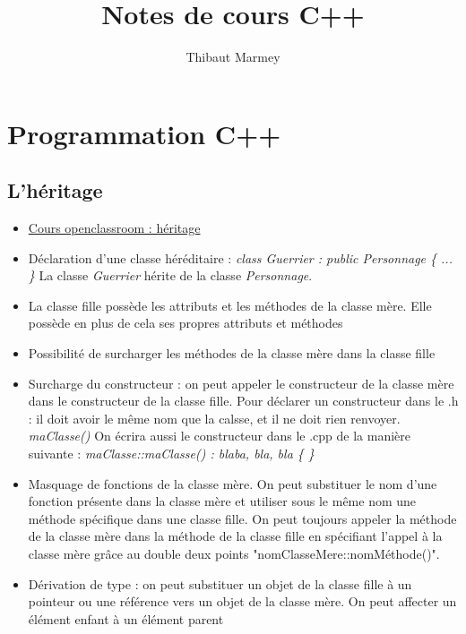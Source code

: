 \documentclass[12pt,a4paper]{article}
\author{Thibaut Marmey}
\title{Notes de cours C++}
\begin{document}
	\maketitle

\begin{normalsize}
\tableofcontents
\end{normalsize}

\section{Programmation C++}
\subsection{L'héritage}
\begin{itemize}
\item \href{https://openclassrooms.com/fr/courses/1894236-programmez-avec-le-langage-c/1898475-lheritage}{Cours openclassroom : héritage}
\item Déclaration d'une classe héréditaire : \textit{class Guerrier : public Personnage \{ ... \}}
\newline La classe \textit{Guerrier} hérite de la classe \textit{Personnage}.
\item La classe fille possède les attributs et les méthodes de la classe mère. Elle possède en plus de cela ses propres attributs et méthodes
\item Possibilité de surcharger les méthodes de la classe mère dans la classe fille
\item Surcharge du constructeur : on peut appeler le constructeur de la classe mère dans le constructeur de la classe fille.
\newline Pour déclarer un constructeur dans le .h : il doit avoir le même nom que la calsse, et il ne doit rien renvoyer. \textit{maClasse()}
\newline On écrira aussi le constructeur dans le .cpp de la manière suivante : 
\newline \textit{maClasse::maClasse() : blaba, bla, bla \{ \}}
\item Masquage de fonctions de la classe mère. On peut substituer le nom d'une fonction présente dans la classe mère et utiliser sous le même nom une méthode spécifique dans une classe fille. On peut toujours appeler la méthode de la classe mère dans la méthode de la classe fille en spécifiant l'appel à la classe mère grâce au double deux points "nomClasseMere::nomMéthode()".
\item Dérivation de type : on peut substituer un objet de la classe fille à un pointeur ou une référence vers un objet de la classe mère. On peut affecter un élément enfant à un élément parent

\end{itemize}
\end{document}
